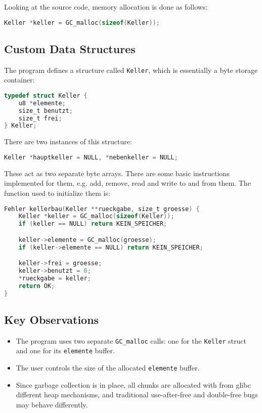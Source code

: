 \documentclass[a4paper,11pt]{article}
\begin{document}
\vspace{1em}
Looking at the source code, memory allocation is done as follows:
\begin{lstlisting}[language=C]
Keller *keller = GC_malloc(sizeof(Keller));
\end{lstlisting}

\subsection*{Custom Data Structures}

The program defines a structure called \texttt{Keller}, which is essentially a byte storage container:

\begin{lstlisting}[language=C]
typedef struct Keller {
    u8 *elemente;
    size_t benutzt;
    size_t frei;
} Keller;
\end{lstlisting}

There are two instances of this structure:
\begin{lstlisting}[language=C]
Keller *hauptkeller = NULL, *nebenkeller = NULL;
\end{lstlisting}

These act as two separate byte arrays.
There are some basic instructions implemented for them, e.g. add, remove, read and write to and from them. The function used to initialize them is:

\begin{lstlisting}[language=C]
Fehler kellerbau(Keller **rueckgabe, size_t groesse) {
    Keller *keller = GC_malloc(sizeof(Keller));
    if (keller == NULL) return KEIN_SPEICHER;

    keller->elemente = GC_malloc(groesse);
    if (keller->elemente == NULL) return KEIN_SPEICHER;

    keller->frei = groesse;
    keller->benutzt = 0;
    *rueckgabe = keller;
    return OK;
}
\end{lstlisting}

\subsection*{Key Observations}
\begin{itemize}
    \item The program uses two separate \texttt{GC\_malloc} calls: one for the \texttt{Keller} struct and one for its \texttt{elemente} buffer.
    \item The user controls the size of the allocated \texttt{elemente} buffer.
    \item Since garbage collection is in place, all chunks are allocated with from glibc different heap mechanisms, and traditional use-after-free and double-free bugs may behave differently.
\end{itemize}
\end{document}

